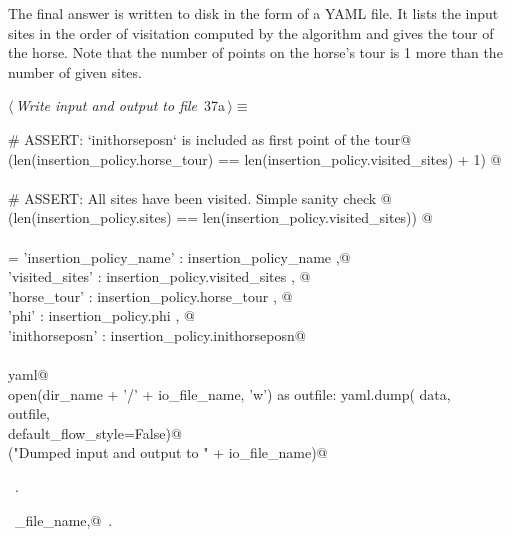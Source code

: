 \documentclass[11.5pt]{report}
\begin{document}
\vspace{-0.8cm}\newchunk The final answer is written to disk in the form of a YAML file. It lists the input sites 
in the order of visitation computed by the algorithm and gives the tour of the horse. 
Note that the number of points on the horse's tour is 1 more than the number of given sites. 
\begin{flushleft} \small\label{scrap47}\raggedright\small
{} $\langle\,${\itshape Write input and output to file}\nobreak\ {\footnotesize {37a}}$\,\rangle\equiv$
\vspace{-1ex}
\begin{list}{}{} \item
\mbox{}\verb@# ASSERT: `inithorseposn` is included as first point of the tour@\\
\mbox{}\verb@assert(len(insertion_policy.horse_tour) == len(insertion_policy.visited_sites) + 1) @\\
\mbox{}\verb@@\\
\mbox{}\verb@# ASSERT: All sites have been visited. Simple sanity check @\\
\mbox{}\verb@assert(len(insertion_policy.sites)   == len(insertion_policy.visited_sites)) @\\
\mbox{}\verb@@\\
\mbox{}\verb@data = {'insertion_policy_name' : insertion_policy_name   ,@\\
\mbox{}\verb@        'visited_sites'  : insertion_policy.visited_sites , @\\
\mbox{}\verb@        'horse_tour'     : insertion_policy.horse_tour    , @\\
\mbox{}\verb@        'phi'            : insertion_policy.phi           , @\\
\mbox{}\verb@        'inithorseposn'  : insertion_policy.inithorseposn}@\\
\mbox{}\verb@@\\
\mbox{}\verb@import yaml@\\
\mbox{}\verb@with open(dir_name + '/' + io_file_name, 'w') as outfile:     yaml.dump( data, \@\\
\mbox{}\verb@                outfile, \@\\
\mbox{}\verb@                default_flow_style=False)@\\
\mbox{}\verb@debug("Dumped input and output to " + io_file_name)@\\
\mbox{}\verb@@{\NWsep}
\end{list}
\vspace{-1.5ex}
\footnotesize
\begin{list}{}{\setlength{\itemsep}{-\parsep}\setlength{\itemindent}{-\leftmargin}}
\item \NWtxtMacroRefIn\ .
\item \NWtxtIdentsUsed\nobreak\  \verb@io_file_name,@\nobreak\ .
\item{}
\end{list}
\vspace{4ex}
\end{flushleft}
\end{document}
